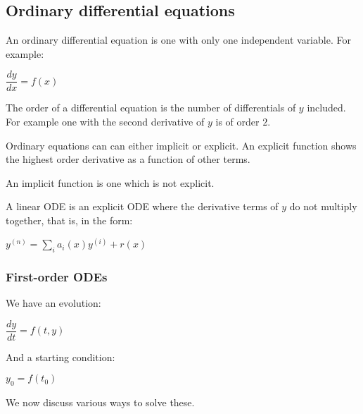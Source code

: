 
\subsection{Ordinary differential equations}

An ordinary differential equation is one with only one independent variable. For example:

\(\dfrac{dy}{dx}=f(x)\)

The order of a differential equation is the number of differentials of \(y\) included. For example one with the second derivative of \(y\) is of order \(2\).

Ordinary equations can can either implicit or explicit. An explicit function shows the highest order derivative as a function of other terms.

An implicit function is one which is not explicit.

A linear ODE is an explicit ODE where the derivative terms of \(y\) do not multiply together, that is, in the form:

\(y^{(n)}=\sum_ia_i(x)y^{(i)}+r(x)\)

\subsubsection{First-order ODEs}

We have an evolution:

\(\dfrac{dy}{dt}=f(t,y)\)

And a starting condition:

\(y_0=f(t_0)\)

We now discuss various ways to solve these.

